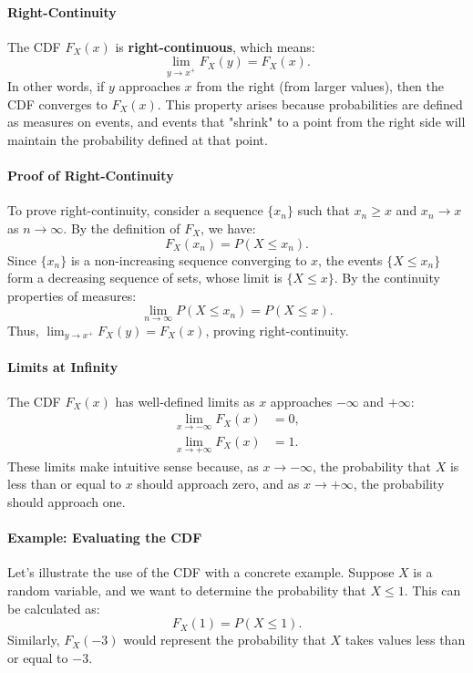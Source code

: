     \paragraph{Right-Continuity}
    
    The CDF \( F_X(x) \) is \textbf{right-continuous}, which means:
    \[
    \lim_{y \to x^+} F_X(y) = F_X(x).
    \]
    In other words, if \( y \) approaches \( x \) from the right (from larger values), then the CDF converges to \( F_X(x) \). This property arises because probabilities are defined as measures on events, and events that "shrink" to a point from the right side will maintain the probability defined at that point.
    
    \paragraph{Proof of Right-Continuity}
    
    To prove right-continuity, consider a sequence \( \{x_n\} \) such that \( x_n \geq x \) and \( x_n \to x \) as \( n \to \infty \). By the definition of \( F_X \), we have:
    \[
    F_X(x_n) = P(X \leq x_n).
    \]
    Since \( \{x_n\} \) is a non-increasing sequence converging to \( x \), the events \( \{X \leq x_n\} \) form a decreasing sequence of sets, whose limit is \( \{X \leq x\} \). By the continuity properties of measures:
    \[
    \lim_{n \to \infty} P(X \leq x_n) = P(X \leq x).
    \]
    Thus, \( \lim_{y \to x^+} F_X(y) = F_X(x) \), proving right-continuity.
    
    \paragraph{Limits at Infinity}
    
    The CDF \( F_X(x) \) has well-defined limits as \( x \) approaches \(-\infty\) and \( +\infty\):
    \begin{align*}
    \lim_{x \to -\infty} F_X(x) &= 0, \\
    \lim_{x \to +\infty} F_X(x) &= 1.
    \end{align*}
    These limits make intuitive sense because, as \( x \to -\infty \), the probability that \( X \) is less than or equal to \( x \) should approach zero, and as \( x \to +\infty \), the probability should approach one.
    
    \paragraph{Example: Evaluating the CDF}
    Let's illustrate the use of the CDF with a concrete example. Suppose \( X \) is a random variable, and we want to determine the probability that \( X \leq 1 \). This can be calculated as:
    \[
    F_X(1) = P(X \leq 1).
    \]
    Similarly, \( F_X(-3) \) would represent the probability that \( X \) takes values less than or equal to \(-3\). 
    
